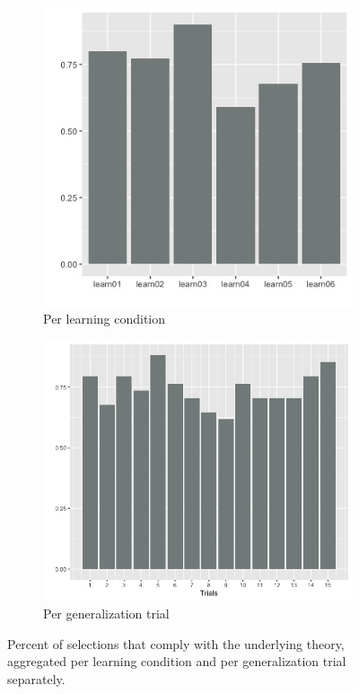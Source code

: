 \documentclass{article}
\begin{document}
\begin{figure}[h!]
  \centering
  \begin{subfigure}[t]{0.4\textwidth}
    \centering
    \includegraphics[width=\linewidth]{total_compliance_per_learning_condition} 
    \caption{Per learning condition}
  \end{subfigure}
  \hfill
  \begin{subfigure}[t]{0.55\textwidth}
    \centering
    \includegraphics[width=\linewidth]{total_compliance_per_trial} 
    \caption{Per generalization trial}
  \end{subfigure}
  \caption{Percent of selections that comply with the underlying theory, aggregated per learning condition and per generalization trial separately.}
  \label{fig:total_comp}
\end{figure}
\end{document}
